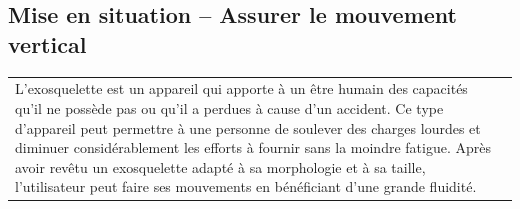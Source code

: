 \documentclass[10pt,fleqn]{article} %
\begin{document}

\vspace{4.5cm}
\pagestyle{fancy}
\thispagestyle{plain}


\def\columnseprulecolor{\color{ocre}}
\setlength{\columnseprule}{0.4pt} 

\ifprof
\else
\begin{multicols}{2}
\fi

\section*{Mise en situation -- Assurer le mouvement vertical}
\ifprof
\else

\noindent
\begin{tabular}{m{.6\linewidth}m{.3\linewidth}}
L’exosquelette est un appareil qui apporte à un être humain des capacités qu’il ne possède pas ou qu’il a perdues à cause d’un accident. Ce type d’appareil peut permettre à une personne de soulever des charges lourdes et diminuer considérablement les efforts à fournir sans la moindre fatigue. Après avoir revêtu un exosquelette adapté à sa morphologie et à sa taille, l’utilisateur peut faire ses mouvements en bénéficiant
d’une grande fluidité.
& 

\end{tabular}
\end{multicols}
\end{document}
